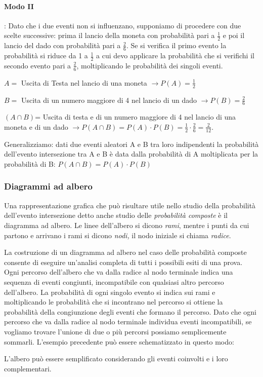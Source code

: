 \begin{esempio}
\paragraph{Modo II}: Dato che i due eventi non si influenzano, supponiamo di 
procedere con due scelte successive: prima il lancio della moneta con 
probabilità pari a $\frac 1 2$ e poi il lancio del dado con probabilità pari a 
$\frac 2 6$. Se si verifica il primo evento la probabilità si riduce da 1 a 
$\frac 1 2$ a cui devo applicare la probabilità che si verifichi il secondo 
evento pari a $\frac 2 6$, moltiplicando le probabilità dei singoli eventi.
\begin{itemize*}
\item $ A = $ Uscita di Testa nel lancio di una moneta $\to P(A)=\frac 1 2$
\item $ B = $ Uscita di un numero maggiore di 4 nel lancio di un dado $\to 
P(B)=\frac 2 6$
\item $(A\cap B)$= Uscita di testa e di un numero maggiore di 4 nel lancio di 
una moneta e di un dado $\to P(A\cap B)=P(A)\cdot P(B)=\frac 1 2\cdot \frac 2 
6=\frac 2{12}$.
\end{itemize*}
\end{esempio}

Generalizziamo: dati due eventi aleatori A e B tra loro indipendenti la 
probabilità dell'evento intersezione tra A e B è data dalla probabilità di A 
moltiplicata per la probabilità di B: $P(A\cap B)=P(A)\cdot P(B)$
\subsubsection*{Diagrammi ad albero}
Una rappresentazione grafica che può risultare utile nello studio della 
probabilità dell'evento intersezione detto anche studio delle \emph{probabilità 
composte} è il diagramma ad albero. Le linee dell'albero si dicono \emph{rami}, 
mentre i punti da cui partono e arrivano i rami si dicono \emph{nodi,} il nodo 
iniziale si chiama \emph{radice}.

La costruzione di un diagramma ad albero nel caso delle probabilità composte 
consente di eseguire un'analisi completa di tutti i possibili esiti di una 
prova. Ogni percorso dell'albero che va dalla radice al nodo terminale indica 
una sequenza di eventi congiunti, incompatibile con qualsiasi altro percorso 
dell'albero. La probabilità di ogni singolo evento si indica sui rami e 
moltiplicando le probabilità che si incontrano nel percorso si ottiene la 
probabilità della congiunzione degli eventi che formano il percorso. Dato che 
ogni percorso che va dalla radice al nodo terminale individua eventi 
incompatibili, se vogliamo trovare l'unione di due o più percorsi possiamo 
semplicemente sommarli.
L'esempio precedente può essere schematizzato in questo modo:
\begin{center}
 
\end{center}
L'albero può essere semplificato considerando gli eventi coinvolti e i loro 
complementari.

